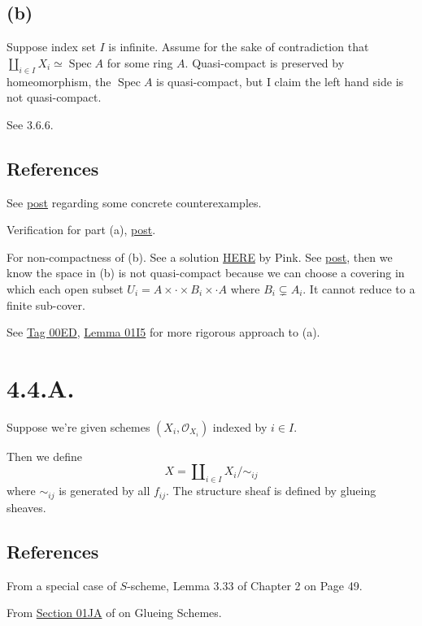 \subsection{(b)}

Suppose index set $I$ is infinite. Assume for the sake of contradiction that $\amalg_{i\in I}X_i\simeq \operatorname{Spec}A$ for some ring $A$. Quasi-compact is preserved by homeomorphism, the $\operatorname{Spec}A$ is quasi-compact, but I claim the left hand side is not quasi-compact. 

See 3.6.6.

\subsection{References}

See \href{https://math.stackexchange.com/questions/778440/spectrum-of-a-product-of-rings-isomorphic-to-the-product-of-the-spectra}{post} regarding some concrete counterexamples.

Verification for part (a), \href{https://math.stackexchange.com/questions/321018/why-is-the-disjoint-union-of-a-finite-number-of-affine-schemes-an-affine-scheme#:~:text=We%20know%20that%20the%20disjoint,space%20is%20not%20quasi%2Dcompact.}{post}.

For non-compactness of (b). See a solution \href{https://metaphor.ethz.ch/x/2017/fs/401-3146-12L/ex/SolSheet6.pdf}{HERE} by Pink. See \href{https://math.stackexchange.com/questions/3038162/proving-mathbbn-is-not-compact}{post}, then we know the space in (b) is not quasi-compact because we can choose a covering in which each open subset $U_i=A\times\cdot\times B_i\times \cdot A$ where $B_i\subsetneq A_i$. It cannot reduce to a finite sub-cover.

See \href{https://stacks.math.columbia.edu/tag/00ED}{Tag 00ED}, \href{https://stacks.math.columbia.edu/tag/01I5}{Lemma 01I5} for more rigorous approach to (a).


\section{4.4.A.}

Suppose we're given schemes $(X_i,\mathcal O_{X_i})$ indexed by $i\in I$.

Then we define 
\[X=\amalg_{i\in I}X_i/\sim_{ij}\]where $\sim_{ij}$ is generated by all $f_{ij}$. The structure sheaf is defined by glueing sheaves. 

\subsection{References}

From a special case of $S$-scheme, \cite{qing2006algebraic} Lemma 3.33 of Chapter 2 on Page 49.

From \href{https://stacks.math.columbia.edu/tag/01JA}{Section 01JA} of \cite{stacks-project} on Glueing Schemes.